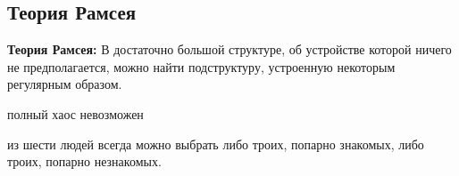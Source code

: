 \subsection{Теория Рамсея}


\textbf{Теория Рамсея:} В достаточно большой структуре, об устройстве которой ничего не предполагается, можно найти подструктуру, устроенную некоторым регулярным образом.
    
полный хаос невозможен

\begin{example}
    из шести людей всегда можно выбрать либо троих, попарно знакомых, либо троих, попарно незнакомых.
\end{example}